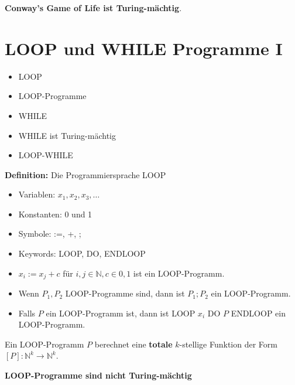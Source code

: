 \documentclass[a4paper,graphics,11pt]{article}
\begin{document}
\textbf{Conway's Game of Life ist Turing-mächtig}.

\newpage

\section{LOOP und WHILE Programme I}
\begin{itemize}
    \item LOOP
    \item LOOP-Programme
    \item WHILE
    \item WHILE ist Turing-mächtig
    \item LOOP-WHILE
\end{itemize}

\textbf{Definition:} Die Programmiersprache LOOP
\begin{itemize}
    \item Variablen: $x_1,x_2,x_3,\dots$
    \item Konstanten: 0 und 1
    \item Symbole: :=, +, ;
    \item Keywords: LOOP, DO, ENDLOOP
    \\
    \item $x_i := x_j + c$ für $i,j \in \mathbb{N}, c\in {0,1}$ ist ein LOOP-Programm.
    \item Wenn $P_1,P_2$ LOOP-Programme sind, dann ist $P_1;P_2$ ein LOOP-Programm.
    \item Falls $P$ ein LOOP-Programm ist, dann ist LOOP $x_i$ DO $P$ ENDLOOP ein LOOP-Programm.
\end{itemize}
Ein LOOP-Programm $P$ berechnet eine \textbf{totale} $k$-stellige Funktion der Form
$[P] : \mathbb{N}^k \to \mathbb{N}^k$.

\textbf{LOOP-Programme sind nicht Turing-mächtig}

\strut
\end{document}
